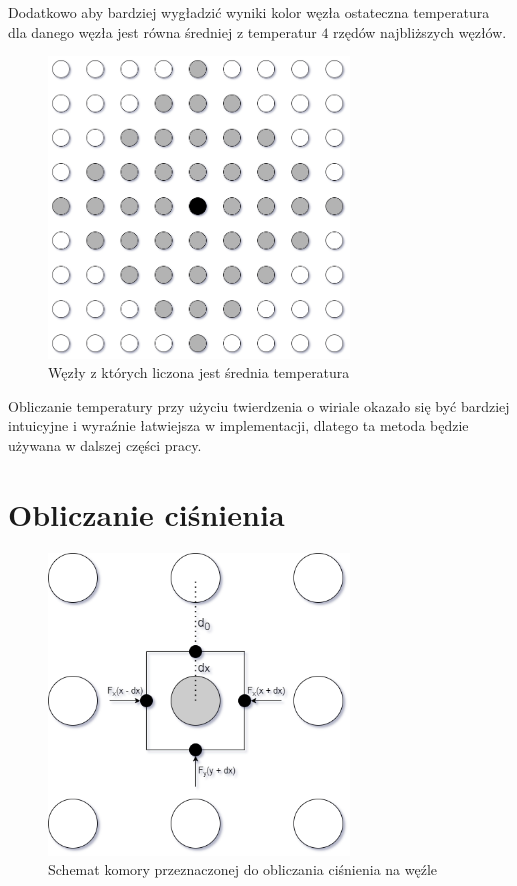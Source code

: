 \documentclass[12pt, letterpaper]{report}
\begin{document}
    Dodatkowo aby bardziej wygładzić wyniki kolor węzła ostateczna temperatura dla danego węzła 
    jest równa średniej z temperatur $4$ rzędów najbliższych węzłów.

    \begin{figure}[H]
        \centering
        \includegraphics[width=8cm]{avg.drawio}
        \caption{Węzły z których liczona jest średnia temperatura}
    \end{figure}

    Obliczanie temperatury przy użyciu twierdzenia o wiriale okazało się być bardziej intuicyjne i
    wyraźnie łatwiejsza w implementacji, dlatego ta metoda będzie używana w dalszej części pracy.

    \section{Obliczanie ciśnienia}

    \begin{figure}[h]
        \centering
        \includegraphics[width=8cm]{pressure_box}
        \caption{Schemat komory przeznaczonej do obliczania ciśnienia na węźle}
    \end{figure}
\end{document}
